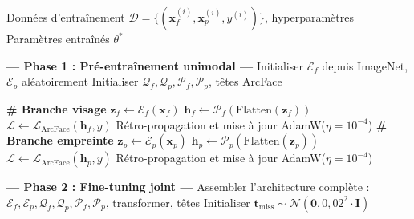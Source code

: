 \documentclass[12pt,a4paper]{report}
\begin{document}
\begin{algorithm}[htbp]
\caption{Boucle d'entra\^{i}nement compl\`{e}te de l'UFM-Transformer}
\label{alg:training}
\begin{algorithmic}[1]
\REQUIRE Donn\'{e}es d'entra\^{i}nement $\mathcal{D} = \{(\mathbf{x}_f^{(i)}, \mathbf{x}_p^{(i)}, y^{(i)})\}$, hyperparam\`{e}tres
\ENSURE Param\`{e}tres entra\^{i}n\'{e}s $\theta^*$

\STATE \textbf{--- Phase 1 : Pr\'{e}-entra\^{i}nement unimodal ---}
\STATE Initialiser $\mathcal{E}_f$ depuis ImageNet, $\mathcal{E}_p$ al\'{e}atoirement
\STATE Initialiser $\mathcal{Q}_f, \mathcal{Q}_p, \mathcal{P}_f, \mathcal{P}_p$, t\^{e}tes ArcFace

    \STATE \textbf{\# Branche visage}
        \STATE $\mathbf{z}_f \leftarrow \mathcal{E}_f(\mathbf{x}_f)$
        \STATE $\mathbf{h}_f \leftarrow \mathcal{P}_f(\text{Flatten}(\mathbf{z}_f))$
        \STATE $\mathcal{L} \leftarrow \mathcal{L}_{\text{ArcFace}}(\mathbf{h}_f, y)$
        \STATE R\'{e}tro-propagation et mise \`{a} jour AdamW($\eta = 10^{-4}$)
    \ENDFOR
    \STATE \textbf{\# Branche empreinte}
        \STATE $\mathbf{z}_p \leftarrow \mathcal{E}_p(\mathbf{x}_p)$
        \STATE $\mathbf{h}_p \leftarrow \mathcal{P}_p(\text{Flatten}(\mathbf{z}_p))$
        \STATE $\mathcal{L} \leftarrow \mathcal{L}_{\text{ArcFace}}(\mathbf{h}_p, y)$
        \STATE R\'{e}tro-propagation et mise \`{a} jour AdamW($\eta = 10^{-4}$)
    \ENDFOR
\ENDFOR

\STATE \textbf{--- Phase 2 : Fine-tuning joint ---}
\STATE Assembler l'architecture compl\`{e}te : $\mathcal{E}_f, \mathcal{E}_p, \mathcal{Q}_f, \mathcal{Q}_p, \mathcal{P}_f, \mathcal{P}_p$, transformer, t\^{e}tes
\STATE Initialiser $\mathbf{t}_{\text{miss}} \sim \mathcal{N}(\mathbf{0}, 0{,}02^2 \cdot \mathbf{I})$


\end{algorithmic}
\end{algorithm}
\end{document}
